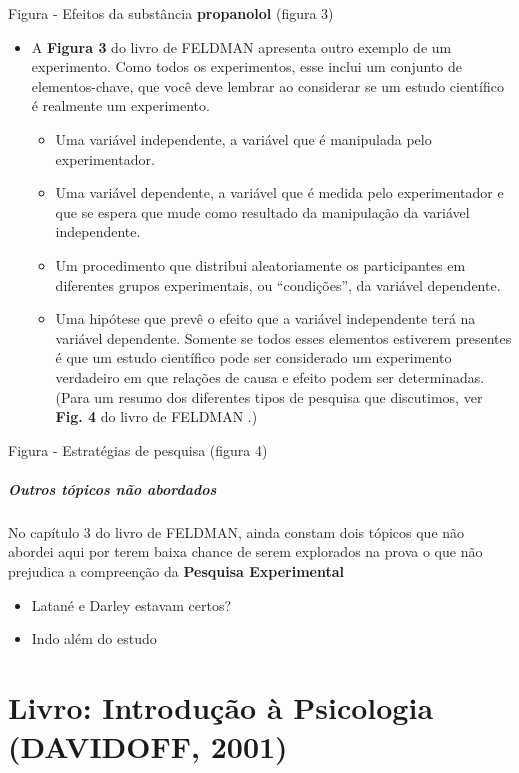 \documentclass[
]{book}
\providecommand{\tightlist}{%
  \setlength{\itemsep}{0pt}\setlength{\parskip}{0pt}}
\begin{document}
Figura - Efeitos da substância \textbf{propanolol} (figura 3)

\begin{itemize}
\tightlist
\item
  A \textbf{Figura 3} do livro de FELDMAN apresenta outro exemplo de um experimento. Como todos os experimentos, esse inclui um conjunto de elementos-chave, que você deve lembrar ao considerar se um estudo científico é realmente um experimento.

  \begin{itemize}
  \tightlist
  \item
    Uma variável independente, a variável que é manipulada pelo experimentador.
  \item
    Uma variável dependente, a variável que é medida pelo experimentador e que se espera que mude como resultado da manipulação da variável independente.
  \item
    Um procedimento que distribui aleatoriamente os participantes em diferentes grupos experimentais, ou ``condições'', da variável dependente.
  \item
    Uma hipótese que prevê o efeito que a variável independente terá na variável dependente. Somente se todos esses elementos estiverem presentes é que um estudo científico pode ser considerado um experimento verdadeiro em que relações de causa e efeito podem ser determinadas. (Para um resumo dos diferentes tipos de pesquisa que discutimos, ver \textbf{Fig. 4} do livro de FELDMAN .)
  \end{itemize}
\end{itemize}

Figura - Estratégias de pesquisa (figura 4)

\hypertarget{outros-tuxf3picos-nuxe3o-abordados}{%
\subparagraph{Outros tópicos não abordados}\label{outros-tuxf3picos-nuxe3o-abordados}}

No capítulo 3 do livro de FELDMAN, ainda constam dois tópicos que não abordei aqui por terem baixa chance de serem explorados na prova o que não prejudica a compreenção da \textbf{Pesquisa Experimental}

\begin{itemize}
\tightlist
\item
  Latané e Darley estavam certos?
\item
  Indo além do estudo
\end{itemize}

\hypertarget{livro-introduuxe7uxe3o-uxe0-psicologia-davidoff-2001}{%
\section{\texorpdfstring{Livro: \textbf{Introdução à Psicologia} (DAVIDOFF, 2001)}{Livro: Introdução à Psicologia (DAVIDOFF, 2001)}}\label{livro-introduuxe7uxe3o-uxe0-psicologia-davidoff-2001}}
\end{document}
